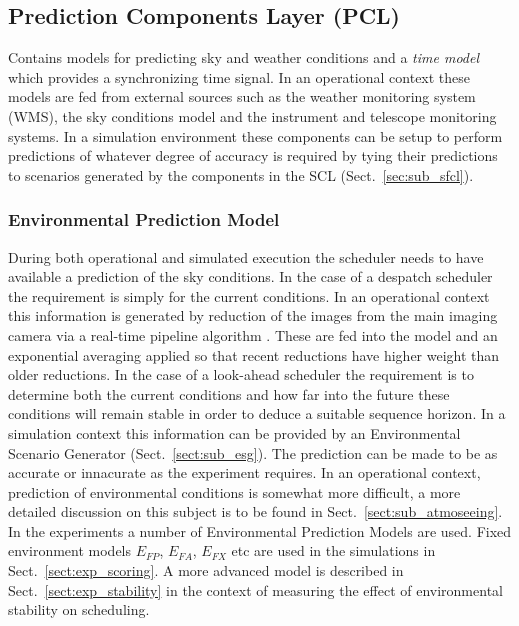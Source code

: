 \subsection{Prediction Components Layer (PCL)}
 Contains models for predicting sky and weather conditions and a \emph{time model} which provides a synchronizing time signal. %
 In an operational context these models are fed from external sources such as the weather monitoring system (WMS), the sky conditions model and the instrument and telescope monitoring systems. In a simulation environment these components can be setup to perform predictions of whatever degree of accuracy is required by tying their predictions to scenarios generated by the components in the SCL (Sect.~\ref{sec:sub_sfcl}).

\subsubsection{Environmental Prediction Model}
During both operational and simulated execution the scheduler needs to have available a prediction of the sky conditions. In the case of a despatch scheduler the requirement is simply for the current conditions. In an operational context this information is generated by reduction of the images from the main imaging camera via a real-time pipeline algorithm \citep{lt11pipelines}. These are fed into the model and an exponential averaging applied so that recent reductions have higher weight than older reductions. In the case of a look-ahead scheduler the requirement is to determine both the current conditions and how far into the future these conditions will remain stable in order to deduce a suitable sequence horizon. In a simulation context this information can be provided by an Environmental Scenario Generator (Sect.~\ref{sect:sub_esg}). The prediction can be made to be as accurate or innacurate as the experiment requires. In an operational context, prediction of environmental conditions is somewhat more difficult, a more detailed discussion on this subject is to be found in Sect.~\ref{sect:sub_atmoseeing}. In the experiments a number of Environmental Prediction Models are used. Fixed environment models $E_{FP}$, $E_{FA}$, $E_{FX}$     etc are used in the simulations in Sect.~\ref{sect:exp_scoring}. A more advanced model is described in Sect.~\ref{sect:exp_stability} in the context of measuring the effect of environmental stability on scheduling. 


